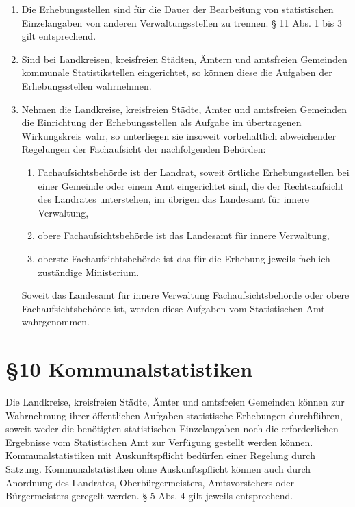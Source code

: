 \begin{enumerate}[label=(\arabic*)]
\begin{enumerate}[label=\arabic*.]
                \end{enumerate}
            \item Die Erhebungsstellen sind für die Dauer der Bearbeitung von statistischen Einzelangaben von anderen Verwaltungsstellen zu trennen. § 11 Abs. 1 bis 3 gilt entsprechend.

            \item Sind bei Landkreisen, kreisfreien Städten, Ämtern und amtsfreien Gemeinden kommunale Statistikstellen eingerichtet, so können diese die Aufgaben der Erhebungsstellen wahrnehmen.
            \item Nehmen die Landkreise, kreisfreien Städte, Ämter und amtsfreien Gemeinden die Einrichtung der Erhebungsstellen als Aufgabe im übertragenen Wirkungskreis wahr, so unterliegen sie insoweit vorbehaltlich abweichender Regelungen der Fachaufsicht der nachfolgenden Behörden:
                \begin{enumerate}[label=\arabic*.]
                    \item Fachaufsichtsbehörde ist der Landrat, soweit örtliche Erhebungsstellen bei einer Gemeinde oder einem Amt eingerichtet sind, die der Rechtsaufsicht des Landrates unterstehen, im übrigen das Landesamt für innere Verwaltung,
                    \item obere Fachaufsichtsbehörde ist das Landesamt für innere Verwaltung,
                    \item oberste Fachaufsichtsbehörde ist das für die Erhebung jeweils fachlich zuständige Ministerium.
                \end{enumerate}
                Soweit das Landesamt für innere Verwaltung Fachaufsichtsbehörde oder obere Fachaufsichtsbehörde ist, werden diese Aufgaben vom Statistischen Amt wahrgenommen.
        \end{enumerate}

    \section{\S10 Kommunalstatistiken}
        Die Landkreise, kreisfreien Städte, Ämter und amtsfreien Gemeinden können zur Wahrnehmung ihrer öffentlichen Aufgaben statistische Erhebungen durchführen, soweit weder die benötigten statistischen Einzelangaben noch die erforderlichen Ergebnisse vom Statistischen Amt zur Verfügung gestellt werden können. Kommunalstatistiken mit Auskunftspflicht bedürfen einer Regelung durch Satzung. Kommunalstatistiken ohne Auskunftspflicht können auch durch Anordnung des Landrates, Oberbürgermeisters, Amtsvorstehers oder Bürgermeisters geregelt werden. § 5 Abs. 4 gilt jeweils entsprechend.


